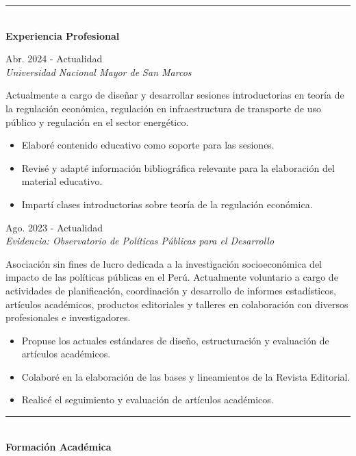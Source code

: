 \documentclass{resume}
\begin{document}
{\color{vino} \noindent \rule{\textwidth}{1pt}} \\
{\color{vino} \noindent \faBriefcase \; {\large \bf Experiencia Profesional}}
\vspace{3pt}

 \hfill {Abr. 2024 - Actualidad} \\
{\it Universidad Nacional Mayor de San Marcos}
\vspace{3pt}

\noindent Actualmente a cargo de diseñar y desarrollar sesiones introductorias en teoría de la regulación económica,
regulación en infraestructura de transporte de uso público y regulación en el sector energético.
\begin{itemize}[noitemsep,topsep=3pt]
	\item Elaboré contenido educativo como soporte para las sesiones.
	\item Revisé y adapté información bibliográfica relevante para la elaboración del material educativo.
	\item Impartí clases introductorias sobre teoría de la regulación económica.
\end{itemize}

 \hfill {Ago. 2023 - Actualidad} \\
{\it Evidencia: Observatorio de Políticas Públicas para el Desarrollo}
\vspace{3pt}

\noindent Asociación sin fines de lucro dedicada a la investigación socioeconómica del impacto de las políticas públicas en el Perú.
Actualmente voluntario a cargo de actividades de planificación, coordinación y desarrollo de informes estadísticos,
artículos académicos, productos editoriales y talleres en colaboración con diversos profesionales e investigadores.
\begin{itemize}[noitemsep,topsep=3pt]
	\item Propuse los actuales estándares de diseño, estructuración y evaluación de artículos académicos.
	\item Colaboré en la elaboración de las bases y lineamientos de la Revista Editorial.
	\item Realicé el seguimiento y evaluación de artículos académicos.
\end{itemize}


{\color{vino} \noindent \rule{\textwidth}{1pt}} \\
{\color{vino} \noindent \faGraduationCap \; {\large \bf Formación Académica}}
\vspace{3pt}
\end{document}

